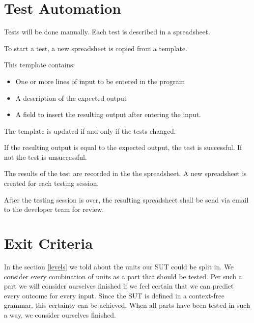 \documentclass[11pt,a4paper]{article}
\begin{document}
\section{Test Automation}\label{sec:test-automation}

Tests will be done manually. Each test is described in a spreadsheet.

To start a test, a new spreadsheet is copied from a template.

This template contains:

\begin{itemize}
\item One or more lines of input to be entered in the program
\item A description of the expected output
\item A field to insert the resulting output after entering the input.
\end{itemize}

The template is updated if and only if the tests  changed.

If the resulting output is equal to the expected output, the test is
successful. If not the test is unsuccessful.

The results of the test are recorded in the the spreadsheet. A new
spreadsheet is created for each testing session.

After the testing session is over, the resulting spreadsheet shall be
send via email to the developer team for review.


\section{Exit Criteria}

In the section \ref{levels} we told about the units our SUT could be split in. We consider every combination of units as a part that should be tested. Per such a part we will consider ourselves finished if we feel certain that we can predict every outcome for every input. Since the SUT is defined in a context-free grammar, this certainty can be achieved. When all parts have been tested in such a way, we consider ourselves finished.
\end{document}
